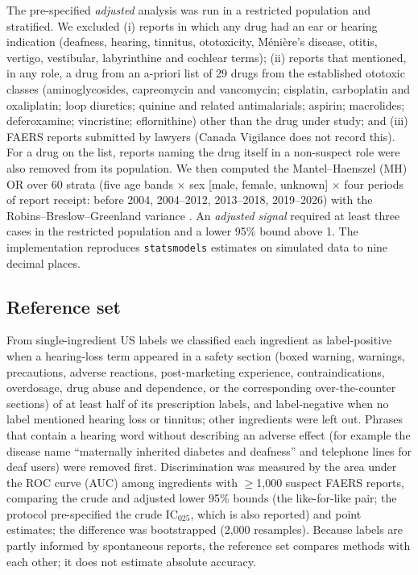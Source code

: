 \documentclass[11pt]{article}
\begin{document}
The pre-specified \emph{adjusted} analysis was run in a restricted population and stratified. We excluded (i) reports in
which any drug had an ear or hearing indication (deafness, hearing, tinnitus, ototoxicity, M\'eni\`ere's disease, otitis,
vertigo, vestibular, labyrinthine and cochlear terms); (ii) reports that mentioned, in any role, a drug from an a-priori list
of 29 drugs from the established ototoxic classes \cite{lanvers2017} (aminoglycosides, capreomycin and vancomycin; cisplatin,
carboplatin and oxaliplatin; loop diuretics; quinine and related antimalarials; aspirin; macrolides; deferoxamine;
vincristine; eflornithine) other than the drug under study; and (iii) FAERS reports submitted by lawyers (Canada Vigilance
does not record this). For a drug on the list, reports naming the drug itself in a non-suspect role were also removed from
its population. We then computed the Mantel--Haenszel (MH) OR \cite{mantel1959} over 60 strata (five age bands $\times$ sex
[male, female, unknown] $\times$ four periods of report receipt: before 2004, 2004--2012, 2013--2018, 2019--2026) with the Robins--Breslow--Greenland variance \cite{robins1986}. An
\emph{adjusted signal} required at least three cases in the restricted population and a lower 95\% bound above 1. The
implementation reproduces \texttt{statsmodels} estimates on simulated data to nine decimal places.

\subsection{Reference set}
From single-ingredient US labels we classified each ingredient as label-positive when a hearing-loss term appeared in a
safety section (boxed warning, warnings, precautions, adverse reactions, post-marketing experience, contraindications,
overdosage, drug abuse and dependence, or the corresponding over-the-counter sections) of at least half of its prescription
labels, and label-negative when no label mentioned hearing loss or tinnitus; other ingredients were left out. Phrases that
contain a hearing word without describing an adverse effect (for example the disease name ``maternally inherited diabetes and
deafness'' and telephone lines for deaf users) were removed first. Discrimination was measured by the area under the ROC
curve (AUC) among ingredients with $\geq$1{,}000 suspect FAERS reports, comparing the crude and adjusted lower 95\% bounds
(the like-for-like pair; the protocol pre-specified the crude IC$_{025}$, which is also reported) and point estimates; the difference was bootstrapped (2{,}000
resamples). Because labels are partly informed by spontaneous reports, the reference set compares methods with each other;
it does not estimate absolute accuracy.
\end{document}

